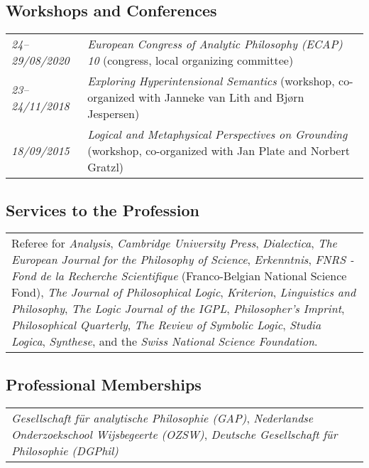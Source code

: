 \subsection*{Workshops and Conferences}
\begin{tabular}{l p{.8\linewidth}}
  \emph{24--29/08/2020} & \emph{European Congress of Analytic Philosophy (ECAP) 10} (congress, local organizing committee)\\[1ex]
  \emph{23--24/11/2018} & \emph{Exploring Hyperintensional Semantics} (workshop, co-organized with Janneke van Lith and Bj{\o}rn Jespersen)\\[1ex]
  \emph{18/09/2015} & \emph{Logical and Metaphysical Perspectives on Grounding} (workshop, co-organized with Jan Plate and Norbert Gratzl)\\
\end{tabular}

\subsection*{Services to the Profession}
\begin{tabular}{p{\linewidth}}
  Referee for
  \emph{Analysis},
  \emph{Cambridge University Press},
  \emph{Dialectica},
  \emph{The European Journal for the Philosophy of Science},
  \emph{Erkenntnis},
  \emph{FNRS - Fond de la Recherche Scientifique} (Franco-Belgian National Science Fond),
  \emph{The Journal of Philosophical Logic},
  \emph{Kriterion},
  \emph{Linguistics and Philosophy},
  \emph{The Logic Journal of the IGPL},
  \emph{Philosopher's Imprint},
  \emph{Philosophical Quarterly},
  \emph{The Review of Symbolic Logic},
  \emph{Studia Logica},
  \emph{Synthese},
  and the \emph{Swiss National Science Foundation}.

\end{tabular}

\subsection*{Professional Memberships}
\begin{tabular}{p{\linewidth}}
  \emph{Gesellschaft f\"ur analytische Philosophie (GAP)}, \emph{Nederlandse Onderzoekschool Wijsbegeerte (OZSW)}, \emph{Deutsche Gesellschaft f\"ur Philosophie (DGPhil)}\\
\end{tabular}
